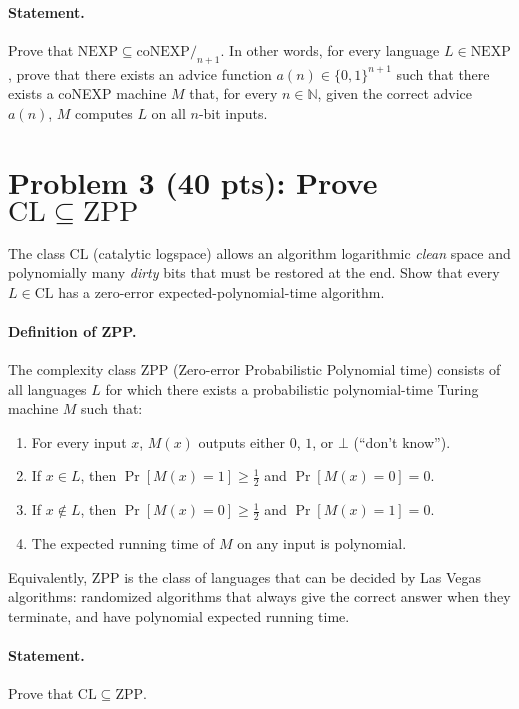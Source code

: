 \documentclass[12pt]{article}
\newcommand{\NEXP}{\text{NEXP}}
\newcommand{\coNEXP}{\text{coNEXP}}
\newcommand{\ZPP}{\text{ZPP}}
\begin{document}
\paragraph{Statement.}
Prove that $\NEXP \subseteq \coNEXP/_{n+1}$. In other words, for every language $L \in \NEXP$, prove that there exists an advice function $a(n) \in \{0,1\}^{n+1}$ such that there exists a coNEXP machine $M$ that, for every $n \in \mathbb{N}$, given the correct advice $a(n)$, $M$ computes $L$ on all $n$-bit inputs.

\newpage

\section{Problem 3 (40 pts): Prove \texorpdfstring{$\mathrm{CL} \subseteq \ZPP$}{CL ⊆ ZPP}}

The class $\mathrm{CL}$ (catalytic logspace) allows an algorithm logarithmic \emph{clean} space and polynomially many \emph{dirty} bits that must be restored at the end. Show that every $L \in \mathrm{CL}$ has a zero-error expected-polynomial-time algorithm.

\paragraph{Definition of ZPP.}
The complexity class $\ZPP$ (Zero-error Probabilistic Polynomial time) consists of all languages $L$ for which there exists a probabilistic polynomial-time Turing machine $M$ such that:
\begin{enumerate}
    \item For every input $x$, $M(x)$ outputs either $0$, $1$, or $\bot$ (``don't know'').
    \item If $x \in L$, then $\Pr[M(x) = 1] \geq \frac{1}{2}$ and $\Pr[M(x) = 0] = 0$.
    \item If $x \notin L$, then $\Pr[M(x) = 0] \geq \frac{1}{2}$ and $\Pr[M(x) = 1] = 0$.
    \item The expected running time of $M$ on any input is polynomial.
\end{enumerate}

Equivalently, $\ZPP$ is the class of languages that can be decided by Las Vegas algorithms: randomized algorithms that always give the correct answer when they terminate, and have polynomial expected running time.

\paragraph{Statement.}
Prove that $\mathrm{CL} \subseteq \ZPP$.
\end{document}

